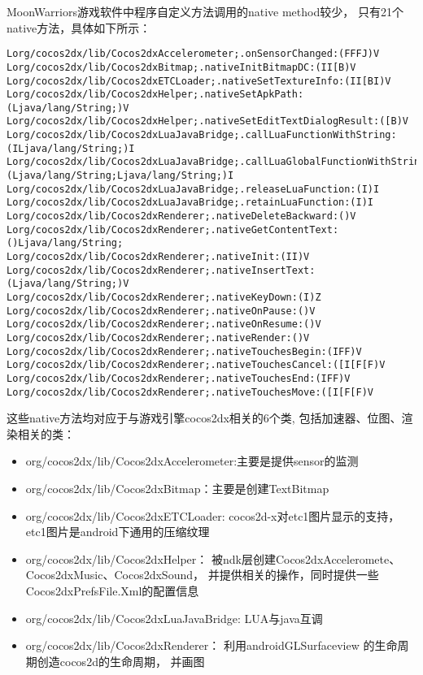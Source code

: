 MoonWarriors游戏软件中程序自定义方法调用的native method较少，
只有21个native方法，具体如下所示：
\begin{lstlisting}
Lorg/cocos2dx/lib/Cocos2dxAccelerometer;.onSensorChanged:(FFFJ)V
Lorg/cocos2dx/lib/Cocos2dxBitmap;.nativeInitBitmapDC:(II[B)V
Lorg/cocos2dx/lib/Cocos2dxETCLoader;.nativeSetTextureInfo:(II[BI)V
Lorg/cocos2dx/lib/Cocos2dxHelper;.nativeSetApkPath:(Ljava/lang/String;)V
Lorg/cocos2dx/lib/Cocos2dxHelper;.nativeSetEditTextDialogResult:([B)V
Lorg/cocos2dx/lib/Cocos2dxLuaJavaBridge;.callLuaFunctionWithString:(ILjava/lang/String;)I
Lorg/cocos2dx/lib/Cocos2dxLuaJavaBridge;.callLuaGlobalFunctionWithString:(Ljava/lang/String;Ljava/lang/String;)I
Lorg/cocos2dx/lib/Cocos2dxLuaJavaBridge;.releaseLuaFunction:(I)I
Lorg/cocos2dx/lib/Cocos2dxLuaJavaBridge;.retainLuaFunction:(I)I
Lorg/cocos2dx/lib/Cocos2dxRenderer;.nativeDeleteBackward:()V
Lorg/cocos2dx/lib/Cocos2dxRenderer;.nativeGetContentText:()Ljava/lang/String;
Lorg/cocos2dx/lib/Cocos2dxRenderer;.nativeInit:(II)V
Lorg/cocos2dx/lib/Cocos2dxRenderer;.nativeInsertText:(Ljava/lang/String;)V
Lorg/cocos2dx/lib/Cocos2dxRenderer;.nativeKeyDown:(I)Z
Lorg/cocos2dx/lib/Cocos2dxRenderer;.nativeOnPause:()V
Lorg/cocos2dx/lib/Cocos2dxRenderer;.nativeOnResume:()V
Lorg/cocos2dx/lib/Cocos2dxRenderer;.nativeRender:()V
Lorg/cocos2dx/lib/Cocos2dxRenderer;.nativeTouchesBegin:(IFF)V
Lorg/cocos2dx/lib/Cocos2dxRenderer;.nativeTouchesCancel:([I[F[F)V
Lorg/cocos2dx/lib/Cocos2dxRenderer;.nativeTouchesEnd:(IFF)V
Lorg/cocos2dx/lib/Cocos2dxRenderer;.nativeTouchesMove:([I[F[F)V
\end{lstlisting}
这些native方法均对应于与游戏引擎cocos2dx相关的6个类,
包括加速器、位图、渲染相关的类：
\begin{itemize}
\item org/cocos2dx/lib/Cocos2dxAccelerometer:主要是提供sensor的监测
\item org/cocos2dx/lib/Cocos2dxBitmap：主要是创建TextBitmap
\item org/cocos2dx/lib/Cocos2dxETCLoader:
	cocos2d-x对etc1图片显示的支持，etc1图片是android下通用的压缩纹理
\item org/cocos2dx/lib/Cocos2dxHelper：
	被ndk层创建Cocos2dxAcceleromete、Cocos2dxMusic、Cocos2dxSound，
	并提供相关的操作，同时提供一些Cocos2dxPrefsFile.Xml的配置信息
\item org/cocos2dx/lib/Cocos2dxLuaJavaBridge: LUA与java互调
\item org/cocos2dx/lib/Cocos2dxRenderer：
	利用androidGLSurfaceview 的生命周期创造cocos2d的生命周期，
	并画图
\end{itemize}

